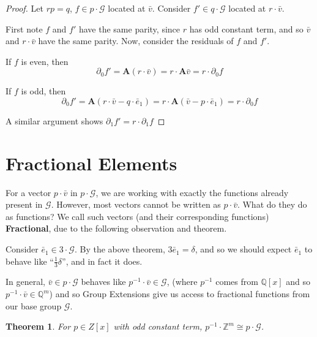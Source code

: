 \documentclass[runningheads]{llncs}
\newcommand{\G}{\mathcal{G}}
\newcommand{\Z}{\mathbb{Z}}
\newcommand{\Q}{\mathbb{Q}}
\newcommand{\2}{\textbf{2}}
\newcommand{\Am}{\textbf{A}}
\newcommand{\del}{\partial}
\renewcommand{\v}{\bar{v}}
\newcommand{\e}{\bar{e}}
\newtheorem{thm}{Theorem}
\begin{document}
\begin{proof}
  Let $rp = q$, $f \in p \cdot \G$ located at $\v$.
  Consider $f' \in q \cdot \G$ located at $r \cdot \v$.

  First note $f$ and $f'$ have the same parity, since 
  $r$ has odd constant term, and so $\v$ and $r \cdot \v$
  have the same parity. Now, consider the residuals of $f$ and $f'$. 
  
  If $f$ is even, then 
  \[ \del_0 f' = \Am (r \cdot \v) = r \cdot \Am \v = r \cdot \del_0 f \]

  If $f$ is odd, then
  \[ \del_0 f' = \Am (r \cdot \v - q \cdot \e_1) 
               = r \cdot \Am (\v - p \cdot \e_1)
               = r \cdot \del_0 f \]

  A similar argument shows $\del_1 f' = r \cdot \del_1 f$
\end{proof}

\section{Fractional Elements}
For a vector $p \cdot \v$ in $p \cdot \G$, we are working with exactly
the functions already present in $\G$. However, most vectors cannot be written
as $p \cdot \v$. What do they do as functions?
We call such vectors (and their corresponding functions)
\textbf{Fractional}, due to the following observation and theorem.

Consider $\e_1 \in 3 \cdot \G$. By the above theorem, $3\e_1 = \delta$,
and so we should expect $\e_1$ to behave like ``$\frac{1}{3}\delta$'', 
and in fact it does.

In general, $\v \in p \cdot \G$ behaves like $p^{-1} \cdot \v \in \G$,
(where $p^{-1}$ comes from $\Q[x]$ and so $p^{-1} \cdot \v \in \Q^m$)
and so Group Extensions give us access to fractional functions from 
our base group $\G$.

\begin{thm}
  For $p \in Z[x]$ with odd constant term, 
  $p^{-1} \cdot \Z^m \cong p \cdot \G$.
\end{thm}
\end{document}
